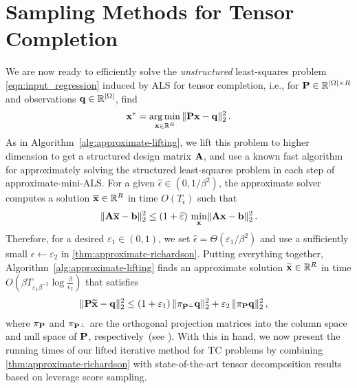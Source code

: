 \section{Sampling Methods for Tensor Completion}
\label{sec:sampling-for-completion}
We are now ready to efficiently solve the \emph{unstructured} least-squares problem \eqref{eqn:input_regression} induced by ALS for tensor completion, i.e., for $\mathbf{P}\in\mathbb{R}^{|\Omega|\times R}$ and observations $\mathbf{q} \in \mathbb{R}^{|\Omega|}$, find
\[
    \mathbf{x}^* = \operatorname*{arg\,min}_{\mathbf{x} \in \mathbb{R}^R} \,\lVert\mathbf{P} \mathbf{x} - \mathbf{q}\rVert_{2}^2\,.
\]
As in Algorithm~\ref{alg:approximate-lifting},
we lift this problem to higher dimension to get a structured design matrix $\mathbf{A}$,
and use a known fast algorithm for approximately solving the structured least-squares problem in each step of approximate-mini-ALS.
For a given $\widehat{\epsilon} \in (0,1/\beta^2)$, the approximate solver computes a solution $\overline{\mathbf{x}}\in \mathbb{R}^R$ in time $O(T_{\widehat{\epsilon}})$ such that 
\[
\lVert\mathbf{A} \overline{\mathbf{x}} - \mathbf{b}\rVert_2^2 \leq (1+\widehat {\varepsilon})\,\min_{\mathbf{x}} \lVert\mathbf{A} \mathbf{x} -\mathbf{b}\rVert_2^2\,.
\]
Therefore, for a desired $\varepsilon_1 \in (0,1)$, we set $\widehat \epsilon = \Theta(\varepsilon_1 / \beta^2)$ and use a sufficiently small $\epsilon \gets \varepsilon_2$ in \cref{thm:approximate-richardson}.
Putting everything together, Algorithm~\ref{alg:approximate-lifting} finds an approximate solution $\widetilde{\mathbf{x}}\in \mathbb{R}^R$ in time $O(\beta T_{\varepsilon_1\beta^{-2}}\log\frac{\beta}{\epsilon_2})$ that satisfies
\begin{align}
    \lVert\mathbf{P} \widetilde{\mathbf{x}} - \mathbf{q}\rVert_2^2
    &\leq
    (1+\varepsilon_1)\,\lVert\pi_{\mathbf{P}^\perp }\mathbf{q}\rVert_2^2 + \varepsilon_2\, \lVert\mathbf{\pi}_{\mathbf{P}}\mathbf{q}\rVert_2^2\,,\label{eq:tc-approx-sol}
\end{align}
where $\mathbf{\pi}_{\mathbf{P}}$ and $\mathbf{\pi}_{\mathbf{P}^\perp}$ are the orthogonal projection matrices into the column space and null space of $\mathbf{P}$, respectively~(see ).
With this in hand, we now present the running times of our lifted iterative method for TC problems
by combining \cref{thm:approximate-richardson} with state-of-the-art tensor decomposition results based on leverage score sampling.


